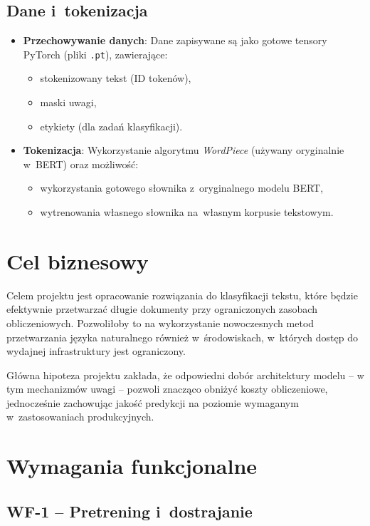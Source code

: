 \documentclass[a4paper,11pt,twoside]{report}
\theoremstyle{definition}
\begin{document}
\subsection{Dane i~tokenizacja}
\begin{itemize}
    \item \textbf{Przechowywanie danych}: Dane zapisywane są jako gotowe tensory PyTorch (pliki \texttt{.pt}), zawierające:
    \begin{itemize}
        \item stokenizowany tekst (ID tokenów),
        \item maski uwagi,
        \item etykiety (dla zadań klasyfikacji).
    \end{itemize}
    \item \textbf{Tokenizacja}: Wykorzystanie algorytmu \textit{WordPiece} (używany oryginalnie w~BERT) oraz możliwość:
    \begin{itemize}
        \item wykorzystania gotowego słownika z~oryginalnego modelu BERT,
        \item wytrenowania własnego słownika na~własnym korpusie tekstowym.
    \end{itemize}
\end{itemize}




\section{Cel biznesowy}
Celem projektu jest opracowanie rozwiązania do klasyfikacji tekstu, które będzie efektywnie przetwarzać długie dokumenty przy ograniczonych zasobach obliczeniowych. Pozwoliłoby to na wykorzystanie nowoczesnych metod przetwarzania języka naturalnego również w~środowiskach, w~których dostęp do wydajnej infrastruktury jest ograniczony.

Główna hipoteza projektu zakłada, że odpowiedni dobór architektury modelu  -- w tym mechanizmów uwagi -- pozwoli znacząco obniżyć koszty obliczeniowe, jednocześnie zachowując jakość predykcji na poziomie wymaganym w~zastosowaniach produkcyjnych.


\section{Wymagania funkcjonalne}\label{sec:functional-requirements}

\subsection{WF-1 -- Pretrening i~dostrajanie}
\end{document}
